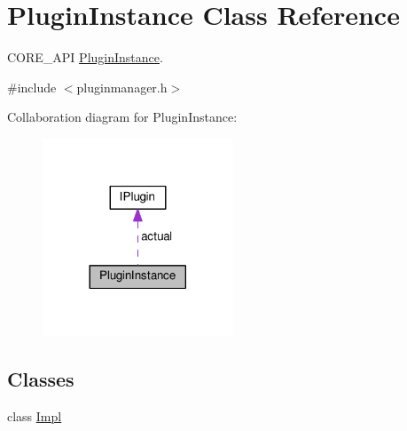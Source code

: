 \hypertarget{class_plugin_instance}{}\section{Plugin\+Instance Class Reference}
\label{class_plugin_instance}


C\+O\+R\+E\+\_\+\+A\+PI \hyperlink{class_plugin_instance}{Plugin\+Instance}.  




{\ttfamily \#include $<$pluginmanager.\+h$>$}



Collaboration diagram for Plugin\+Instance\+:\nopagebreak
\begin{figure}[H]
\begin{center}
\leavevmode
\includegraphics[width=161pt]{class_plugin_instance__coll__graph}
\end{center}
\end{figure}
\subsection*{Classes}
\begin{DoxyCompactItemize}
\item 
class \hyperlink{class_plugin_instance_1_1_impl}{Impl}
\end{DoxyCompactItemize}
